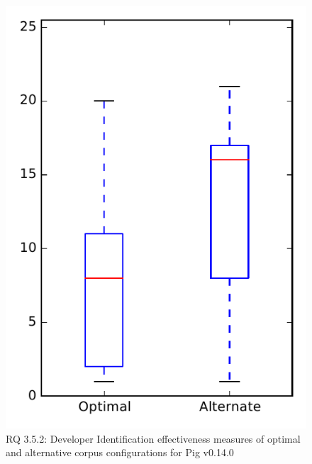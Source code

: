 
\begin{figure}
\centering
\includegraphics[height=0.4\textheight]{figures/combo/dit_rq2_pig}
\caption{RQ 3.5.2: Developer Identification effectiveness measures of optimal and alternative corpus configurations for Pig v0.14.0}
\label{fig:combo:dit:rq2:pig}
\end{figure}
